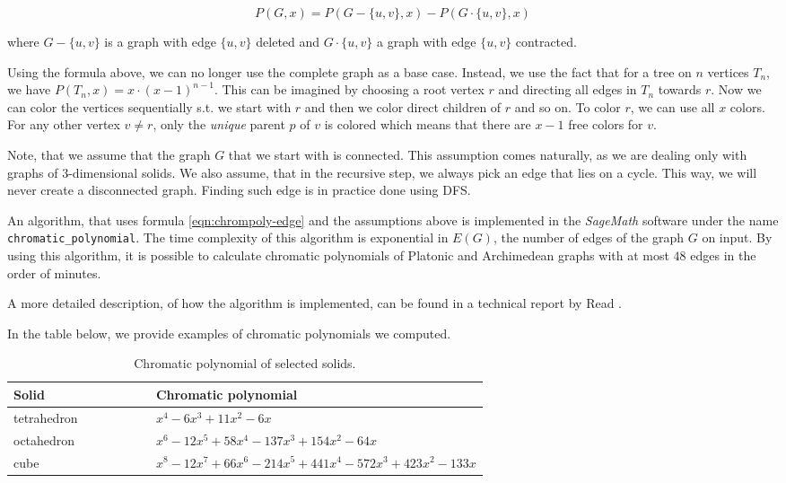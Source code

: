 \begin{equation}\label{eqn:chrompoly-edge}
    P(G,x) = P(G - \{u,v\},x) - P(G \cdot \{u,v\},x)
\end{equation}

where $G - \{u,v\}$ is a graph with edge $\{u,v\}$ deleted and $G \cdot \{u,v\}$ a graph with edge $\{u,v\}$ contracted. 

Using the formula above, we can no longer use the complete graph as a base case. Instead, we use the fact that for a tree on $n$ vertices $T_n$, we have $P(T_n,x) = x \cdot (x-1)^{n-1}$. This can be imagined by choosing a root vertex $r$ and directing all edges in $T_n$ towards $r$. Now we can color the vertices sequentially s.t. we start with $r$ and then we color direct children of $r$ and so on. To color $r$, we can use all $x$ colors. For any other vertex $v \neq r$, only the \textit{unique} parent $p$ of $v$ is colored which means that there are $x-1$ free colors for $v$. 

Note, that we assume that the graph $G$ that we start with is connected. This assumption comes naturally, as we are dealing only with graphs of 3-dimensional solids. We also assume, that in the recursive step, we always pick an edge that lies on a cycle. This way, we will never create a disconnected graph. Finding such edge is in practice done using DFS.

An algorithm, that uses formula \ref{eqn:chrompoly-edge} and the assumptions above is implemented in the \textit{SageMath} \cite{sagemath} software under the name \verb|chromatic_polynomial|. The time complexity of this algorithm is exponential in $E(G)$, the number of edges of the graph $G$ on input. By using this algorithm, it is possible to calculate chromatic polynomials of Platonic and Archimedean graphs with at most $48$ edges in the order of minutes.

A more detailed description, of how the algorithm is implemented, can be found in a technical report by Read \cite{read1987chromatic}.

In the table below, we provide examples of chromatic polynomials we computed.

\begin{table}[H]
\centering
\begin{tabular}{lp{0.7\linewidth}}
\toprule
\textbf{Solid} & \textbf{Chromatic polynomial} \\
\midrule
tetrahedron & $x^{4} - 6x^{3} + 11x^{2} - 6x$ \\
octahedron & $x^{6} - 12x^{5} + 58x^{4} - 137x^{3} + 154x^{2} - 64x$ \\
cube & $x^{8} - 12x^{7} + 66x^{6} - 214x^{5} + 441x^{4} - 572x^{3} + 423x^{2} - 133x$ \\
\bottomrule
\end{tabular}
\caption{Chromatic polynomial of selected solids.}
\label{tab:selected-chrom-polys}
\end{table}


